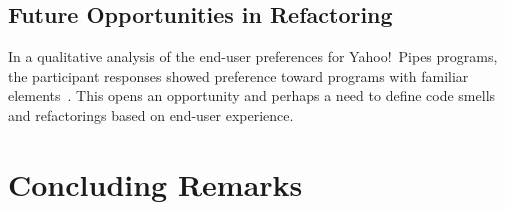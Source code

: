 \documentclass[10pt,conference,compsocconf]{IEEEtran}
\begin{document}
\subsection{Future Opportunities in Refactoring}
In a qualitative analysis of the end-user preferences for Yahoo!\ Pipes programs, the participant responses showed preference toward programs with familiar elements~\cite{Stolee2015}. This opens an opportunity and perhaps a need to define code smells and refactorings based on end-user experience. 


\section{Concluding Remarks}
\label{sec:conclusions}

\newpage
\balance





\end{document}
